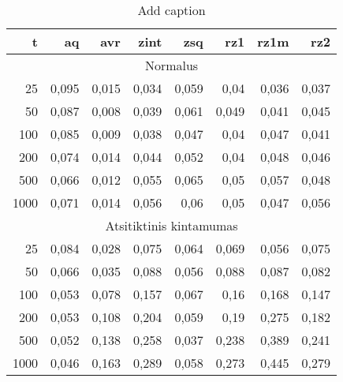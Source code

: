 \begin{table}[htbp]
  \centering
  \caption{Add caption}
    \begin{tabular}{rrrrrrrr}
    \toprule
    t     & aq    & avr   & zint  & zsq   & rz1   & rz1m  & rz2 \\
    \midrule
    \multicolumn{8}{c}{Normalus} \\
    25    & 0,095 & 0,015 & 0,034 & 0,059 & 0,04  & 0,036 & 0,037 \\
    50    & 0,087 & 0,008 & 0,039 & 0,061 & 0,049 & 0,041 & 0,045 \\
    100   & 0,085 & 0,009 & 0,038 & 0,047 & 0,04  & 0,047 & 0,041 \\
    200   & 0,074 & 0,014 & 0,044 & 0,052 & 0,04  & 0,048 & 0,046 \\
    500   & 0,066 & 0,012 & 0,055 & 0,065 & 0,05  & 0,057 & 0,048 \\
    1000  & 0,071 & 0,014 & 0,056 & 0,06  & 0,05  & 0,047 & 0,056 \\
    \multicolumn{8}{c}{Atsitiktinis kintamumas} \\
    25    & 0,084 & 0,028 & 0,075 & 0,064 & 0,069 & 0,056 & 0,075 \\
    50    & 0,066 & 0,035 & 0,088 & 0,056 & 0,088 & 0,087 & 0,082 \\
    100   & 0,053 & 0,078 & 0,157 & 0,067 & 0,16  & 0,168 & 0,147 \\
    200   & 0,053 & 0,108 & 0,204 & 0,059 & 0,19  & 0,275 & 0,182 \\
    500   & 0,052 & 0,138 & 0,258 & 0,037 & 0,238 & 0,389 & 0,241 \\
    1000  & 0,046 & 0,163 & 0,289 & 0,058 & 0,273 & 0,445 & 0,279 \\
    \bottomrule
    \end{tabular}%
  \label{tab:addlabel}%
\end{table}%
